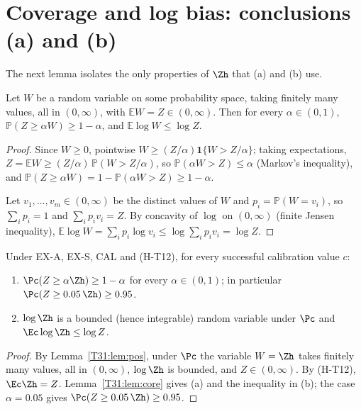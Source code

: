 \documentclass[11pt]{report}
\begin{document}
\section{Coverage and log bias: conclusions (a) and (b)}

The next lemma isolates the only properties of $\Zh$ that (a) and (b) use.

\begin{T31lemma}\label{T31:lem:core}
Let $W$ be a random variable on some probability space, taking finitely many values, all in $(0,\infty)$, with
$\mathbb{E}W=Z\in(0,\infty)$. Then for every $\alpha\in(0,1)$, $\mathbb{P}(Z\ge\alpha W)\ge1-\alpha$, and
$\mathbb{E}\log W\le\log Z$.
\end{T31lemma}

\begin{proof}
Since $W\ge0$, pointwise $W\ge (Z/\alpha)\mathbf 1\{W>Z/\alpha\}$; taking expectations,
$Z=\mathbb{E}W\ge(Z/\alpha)\,\mathbb{P}(W>Z/\alpha)$, so $\mathbb{P}(\alpha W>Z)\le\alpha$ (Markov's inequality), and
$\mathbb{P}(Z\ge\alpha W)=1-\mathbb{P}(\alpha W>Z)\ge1-\alpha$.

Let $v_1,\dots,v_m\in(0,\infty)$ be the distinct values of $W$ and $p_i=\mathbb{P}(W=v_i)$, so $\sum_ip_i=1$ and
$\sum_ip_iv_i=Z$. By concavity of $\log$ on $(0,\infty)$ (finite Jensen inequality),
$\mathbb{E}\log W=\sum_ip_i\log v_i\le\log\sum_ip_iv_i=\log Z$.
\end{proof}

\begin{T31theorem}\label{T31:thm:ab}
Under EX-A, EX-S, CAL and (H-T12), for every successful calibration value $c$:
\begin{enumerate}[label=(\alph*)]
\item $\Pc(Z\ge\alpha\Zh)\ge1-\alpha$ for every $\alpha\in(0,1)$; in particular $\Pc(Z\ge0.05\,\Zh)\ge0.95$.
\item $\log\Zh$ is a bounded (hence integrable) random variable under $\Pc$ and $\Ec\log\Zh\le\log Z$.
\end{enumerate}
\end{T31theorem}

\begin{proof}
By Lemma~\ref{T31:lem:pos}, under $\Pc$ the variable $W=\Zh$ takes finitely many values, all in $(0,\infty)$, $\log\Zh$ is
bounded, and $Z\in(0,\infty)$. By (H-T12), $\Ec\Zh=Z$. Lemma~\ref{T31:lem:core} gives (a) and the inequality in (b); the case
$\alpha=0.05$ gives $\Pc(Z\ge0.05\,\Zh)\ge0.95$.
\end{proof}
\end{document}
